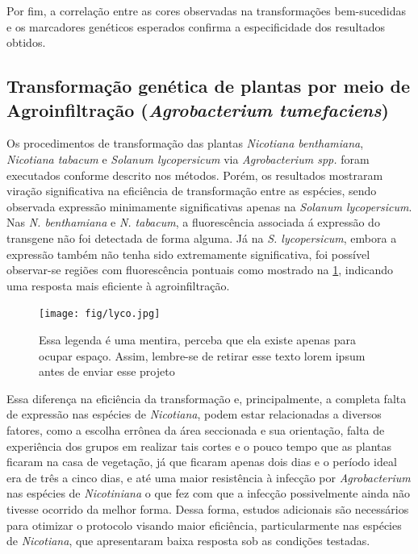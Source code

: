 Por fim, a correlação entre as cores observadas na transformações bem-sucedidas
e os marcadores genéticos esperados confirma a especificidade dos resultados
obtidos.

\subsection{Transformação genética de plantas por meio de Agroinfiltração (\textit{Agrobacterium tumefaciens})}
Os procedimentos de transformação das plantas \textit{Nicotiana benthamiana},
\textit{Nicotiana tabacum} e \textit{Solanum lycopersicum} via
\textit{Agrobacterium spp.} foram executados conforme descrito nos métodos.
Porém, os resultados mostraram viração significativa na eficiência de
transformação entre as espécies, sendo observada expressão minimamente
significativas apenas na \textit{Solanum lycopersicum}.  Nas \textit{N.
benthamiana} e \textit{N. tabacum}, a fluorescência associada á expressão do
transgene não foi detectada de forma alguma. Já na \textit{S.  lycopersicum},
embora a expressão também não tenha sido extremamente significativa, foi
possível observar-se regiões com fluorescência pontuais como mostrado na
\cref{lyco}, indicando uma resposta mais eficiente à agroinfiltração.

\begin{figure}
    \centering
    \texttt{[image: fig/lyco.jpg]}
    \caption{Essa legenda é uma mentira, perceba que ela existe apenas para
    ocupar espaço. Assim, lembre-se de retirar esse texto lorem ipsum antes de
enviar esse projeto} %
    \label{lyco}
\end{figure}

Essa diferença na eficiência da transformação e, principalmente, a completa
falta de expressão nas espécies de \textit{Nicotiana}, podem estar relacionadas a
diversos fatores, como a escolha errônea da área seccionada e sua orientação,
falta de experiência dos grupos em realizar tais cortes e o pouco tempo que as
plantas ficaram na casa de vegetação, já que ficaram apenas dois dias e o
período ideal era de três a cinco dias, e até uma maior resistência à infecção
por \textit{Agrobacterium} nas espécies de \textit{Nicotiniana} o que fez com
que a infecção possivelmente ainda não tivesse ocorrido da melhor forma. Dessa
forma, estudos adicionais são necessários para otimizar o protocolo visando
maior eficiência, particularmente nas espécies de \textit{Nicotiana}, que
apresentaram baixa resposta sob as condições testadas. 
